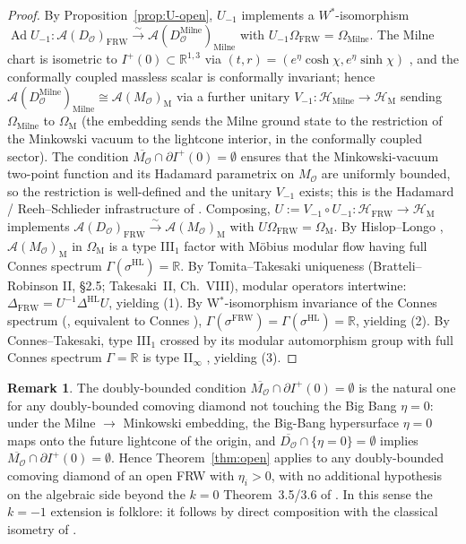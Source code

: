 \documentclass[11pt]{article}
\theoremstyle{definition}
\newtheorem{remark}[theorem]{Remark}
\newcommand{\R}{\mathbb{R}}
\newcommand{\HH}{\mathcal{H}}
\renewcommand{\AA}{\mathcal{A}}
\newcommand{\OO}{\mathcal{O}}
\newcommand{\Ad}{\operatorname{Ad}}
\newcommand{\HL}{\mathrm{HL}}
\newcommand{\FRW}{\mathrm{FRW}}
\newcommand{\Mink}{\mathrm{M}}
\newcommand{\Milne}{\mathrm{Milne}}
\begin{document}
\begin{proof}
By Proposition~\ref{prop:U-open}, $U_{-1}$ implements a $W^*$-isomorphism
$\Ad U_{-1}:\AA(D_\OO)_\FRW\xrightarrow{\sim}\AA(D_\OO^\Milne)_\Milne$ with
$U_{-1}\Omega_\FRW=\Omega_\Milne$. The Milne chart is isometric to
$I^+(0)\subset\R^{1,3}$ via $(t,r)=(e^\eta\cosh\chi,e^\eta\sinh\chi)$
\cite[\S5.3]{Wald1994}, and the conformally coupled massless scalar is
conformally invariant; hence
$\AA(D_\OO^\Milne)_\Milne\cong\AA(M_\OO)_\Mink$ via a further unitary
$V_{-1}:\HH_\Milne\to\HH_\Mink$ sending $\Omega_\Milne$ to $\Omega_\Mink$
(the embedding sends the Milne ground state to the restriction of the
Minkowski vacuum to the lightcone interior, in the conformally coupled
sector). The condition $\overline{M_\OO}\cap\partial I^+(0)=\emptyset$
ensures that the Minkowski-vacuum two-point function and its Hadamard
parametrix on $M_\OO$ are uniformly bounded, so the restriction is well-defined
and the unitary $V_{-1}$ exists; this is the Hadamard / Reeh--Schlieder
infrastructure of \cite{HollandsWald2001, Verch1997}. Composing,
$U:=V_{-1}\circ U_{-1}:\HH_\FRW\to\HH_\Mink$ implements
$\AA(D_\OO)_\FRW\xrightarrow{\sim}\AA(M_\OO)_\Mink$ with
$U\Omega_\FRW=\Omega_\Mink$. By Hislop--Longo \cite{HislopLongo1982},
$\AA(M_\OO)_\Mink$ in $\Omega_\Mink$ is a type III$_1$ factor with
M\"obius modular flow having full Connes spectrum $\Gamma(\sigma^\HL)=\R$.
By Tomita--Takesaki uniqueness (Bratteli--Robinson II, \S2.5; Takesaki~II,
Ch.~VIII), modular operators intertwine: $\Delta_\FRW=U^{-1}\Delta^\HL U$,
yielding (1). By W$^*$-isomorphism invariance of the Connes spectrum
(\cite[Prop.~3.4]{Remondiere2026}, equivalent to Connes
\cite[Th\'eor\`eme~1.2.4]{Connes1973}), $\Gamma(\sigma^\FRW)=\Gamma(\sigma^\HL)=\R$,
yielding (2). By Connes--Takesaki, type III$_1$ crossed by its modular
automorphism group with full Connes spectrum $\Gamma=\R$ is type II$_\infty$
\cite[\S2]{CLPW2023, Witten2022, Connes1973}, yielding (3).
\end{proof}

\begin{remark}\label{rem:open-folklore}
The doubly-bounded condition $\overline{M_\OO}\cap\partial I^+(0)=\emptyset$
is the natural one for any doubly-bounded comoving diamond not touching the
Big Bang $\eta=0$: under the Milne $\to$ Minkowski embedding, the Big-Bang
hypersurface $\eta=0$ maps onto the future lightcone of the origin, and
$\overline{D_\OO}\cap\{\eta=0\}=\emptyset$ implies
$\overline{M_\OO}\cap\partial I^+(0)=\emptyset$. Hence Theorem~\ref{thm:open}
applies to any doubly-bounded comoving diamond of an open FRW with
$\eta_i>0$, with no additional hypothesis on the algebraic side beyond the
$k=0$ Theorem~3.5/3.6 of \cite{Remondiere2026}. In this sense the $k=-1$
extension is folklore: it follows by direct composition with the classical
isometry of \cite[\S5.3]{Wald1994}.
\end{remark}
\end{document}
